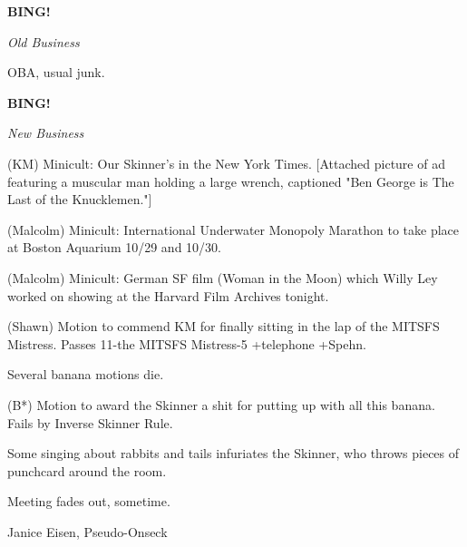 \documentclass[12pt]{article}
\newcommand{\bing}{{\bf BING!} }
\newcommand{\goto}[1]{\bing \vskip 12pt \centerline{{\em{#1}}}}
\begin{document}
\goto{Old Business}

OBA, usual junk.

\goto{New Business}

(KM) Minicult: Our Skinner's in the New York Times. [Attached picture of ad featuring a muscular man holding a large wrench, captioned "Ben George is The Last of the Knucklemen."]

(Malcolm) Minicult: International Underwater Monopoly Marathon to take place at Boston Aquarium 10/29 and 10/30.

(Malcolm) Minicult: German SF film (Woman in the Moon) which Willy Ley worked on showing at the Harvard Film Archives tonight.

(Shawn) Motion to commend KM for finally sitting in the lap of the MITSFS Mistress. Passes 11-the MITSFS Mistress-5 +telephone +Spehn.

Several banana motions die.

(B*) Motion to award the Skinner a shit for putting up with all this banana. Fails by Inverse Skinner Rule.

Some singing about rabbits and tails infuriates the Skinner, who throws pieces of punchcard around the room.

\vspace{12pt}

\noindent
Meeting fades out, sometime.

\vspace{18pt}

\centerline{Janice Eisen, Pseudo-Onseck}
\end{document}

